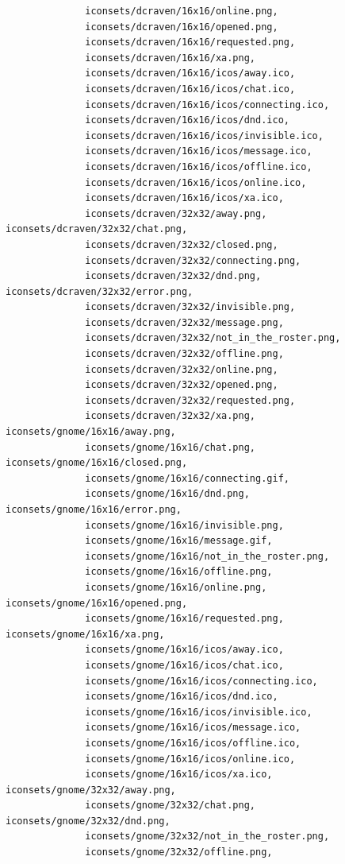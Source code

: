 \documentclass[a4paper]{article}
\begin{document}
\begin{verbatim}
              iconsets/dcraven/16x16/online.png,
              iconsets/dcraven/16x16/opened.png,
              iconsets/dcraven/16x16/requested.png,
              iconsets/dcraven/16x16/xa.png,
              iconsets/dcraven/16x16/icos/away.ico,
              iconsets/dcraven/16x16/icos/chat.ico,
              iconsets/dcraven/16x16/icos/connecting.ico,
              iconsets/dcraven/16x16/icos/dnd.ico,
              iconsets/dcraven/16x16/icos/invisible.ico,
              iconsets/dcraven/16x16/icos/message.ico,
              iconsets/dcraven/16x16/icos/offline.ico,
              iconsets/dcraven/16x16/icos/online.ico,
              iconsets/dcraven/16x16/icos/xa.ico,
              iconsets/dcraven/32x32/away.png, iconsets/dcraven/32x32/chat.png,
              iconsets/dcraven/32x32/closed.png,
              iconsets/dcraven/32x32/connecting.png,
              iconsets/dcraven/32x32/dnd.png, iconsets/dcraven/32x32/error.png,
              iconsets/dcraven/32x32/invisible.png,
              iconsets/dcraven/32x32/message.png,
              iconsets/dcraven/32x32/not_in_the_roster.png,
              iconsets/dcraven/32x32/offline.png,
              iconsets/dcraven/32x32/online.png,
              iconsets/dcraven/32x32/opened.png,
              iconsets/dcraven/32x32/requested.png,
              iconsets/dcraven/32x32/xa.png, iconsets/gnome/16x16/away.png,
              iconsets/gnome/16x16/chat.png, iconsets/gnome/16x16/closed.png,
              iconsets/gnome/16x16/connecting.gif,
              iconsets/gnome/16x16/dnd.png, iconsets/gnome/16x16/error.png,
              iconsets/gnome/16x16/invisible.png,
              iconsets/gnome/16x16/message.gif,
              iconsets/gnome/16x16/not_in_the_roster.png,
              iconsets/gnome/16x16/offline.png,
              iconsets/gnome/16x16/online.png, iconsets/gnome/16x16/opened.png,
              iconsets/gnome/16x16/requested.png, iconsets/gnome/16x16/xa.png,
              iconsets/gnome/16x16/icos/away.ico,
              iconsets/gnome/16x16/icos/chat.ico,
              iconsets/gnome/16x16/icos/connecting.ico,
              iconsets/gnome/16x16/icos/dnd.ico,
              iconsets/gnome/16x16/icos/invisible.ico,
              iconsets/gnome/16x16/icos/message.ico,
              iconsets/gnome/16x16/icos/offline.ico,
              iconsets/gnome/16x16/icos/online.ico,
              iconsets/gnome/16x16/icos/xa.ico, iconsets/gnome/32x32/away.png,
              iconsets/gnome/32x32/chat.png, iconsets/gnome/32x32/dnd.png,
              iconsets/gnome/32x32/not_in_the_roster.png,
              iconsets/gnome/32x32/offline.png,

\end{verbatim}
\end{document}
